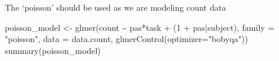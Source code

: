 \documentclass[
]{article}
\newenvironment{Shaded}{\begin{snugshade}}{\end{snugshade}}
\newcommand{\AttributeTok}[1]{\textcolor[rgb]{0.77,0.63,0.00}{#1}}
\newcommand{\DecValTok}[1]{\textcolor[rgb]{0.00,0.00,0.81}{#1}}
\newcommand{\FunctionTok}[1]{\textcolor[rgb]{0.00,0.00,0.00}{#1}}
\newcommand{\NormalTok}[1]{#1}
\newcommand{\OtherTok}[1]{\textcolor[rgb]{0.56,0.35,0.01}{#1}}
\newcommand{\SpecialCharTok}[1]{\textcolor[rgb]{0.00,0.00,0.00}{#1}}
\newcommand{\StringTok}[1]{\textcolor[rgb]{0.31,0.60,0.02}{#1}}
\begin{document}
The `poisson' should be used as we are modeling count data

\begin{Shaded}
\begin{Highlighting}[]
\NormalTok{poisson\_model }\OtherTok{\textless{}{-}} \FunctionTok{glmer}\NormalTok{(count }\SpecialCharTok{\textasciitilde{}}\NormalTok{ pas}\SpecialCharTok{*}\NormalTok{task }\SpecialCharTok{+}\NormalTok{ (}\DecValTok{1} \SpecialCharTok{+}\NormalTok{ pas}\SpecialCharTok{|}\NormalTok{subject), }\AttributeTok{family =} \StringTok{"poisson"}\NormalTok{, }\AttributeTok{data =}\NormalTok{ data.count, }\FunctionTok{glmerControl}\NormalTok{(}\AttributeTok{optimizer=}\StringTok{"bobyqa"}\NormalTok{))}
\FunctionTok{summary}\NormalTok{(poisson\_model)}
\end{Highlighting}
\end{Shaded}
\end{document}
